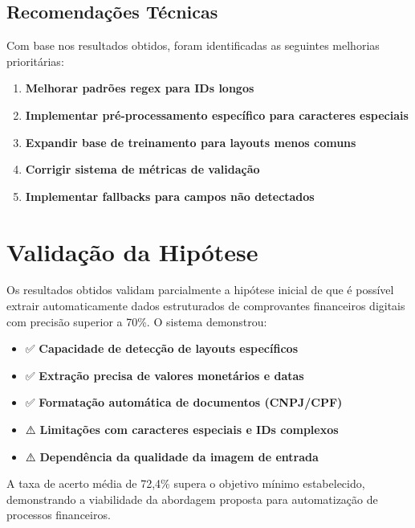 \subsection{Recomendações Técnicas}

Com base nos resultados obtidos, foram identificadas as seguintes melhorias prioritárias:

\begin{enumerate}
    \item \textbf{Melhorar padrões regex para IDs longos}
    \item \textbf{Implementar pré-processamento específico para caracteres especiais}
    \item \textbf{Expandir base de treinamento para layouts menos comuns}
    \item \textbf{Corrigir sistema de métricas de validação}
    \item \textbf{Implementar fallbacks para campos não detectados}
\end{enumerate}

\section{Validação da Hipótese}

Os resultados obtidos validam parcialmente a hipótese inicial de que é possível extrair automaticamente dados estruturados de comprovantes financeiros digitais com precisão superior a 70\%. O sistema demonstrou:

\begin{itemize}
    \item ✅ \textbf{Capacidade de detecção de layouts específicos}
    \item ✅ \textbf{Extração precisa de valores monetários e datas}
    \item ✅ \textbf{Formatação automática de documentos (CNPJ/CPF)}
    \item ⚠️ \textbf{Limitações com caracteres especiais e IDs complexos}
    \item ⚠️ \textbf{Dependência da qualidade da imagem de entrada}
\end{itemize}

A taxa de acerto média de 72,4\% supera o objetivo mínimo estabelecido, demonstrando a viabilidade da abordagem proposta para automatização de processos financeiros.